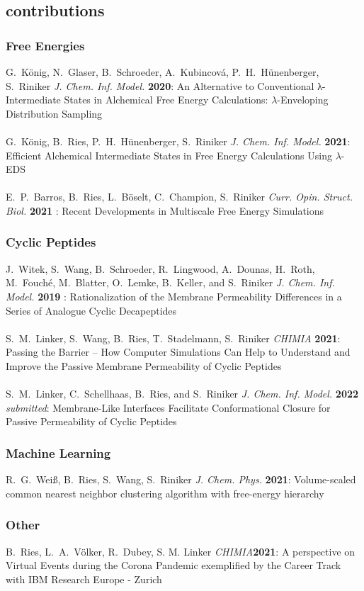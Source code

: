 \subsection*{contributions}

\subsubsection*{Free Energies}

G.\ K\"onig, N.\ Glaser, B.\ Schroeder, A.\ Kubincová, P.\ H.\ H\"unenberger, S.\ Riniker {\em J. Chem. Inf. Model.} {\bf 2020}:
An Alternative to Conventional λ-Intermediate States in Alchemical Free Energy Calculations: $\lambda$-Enveloping Distribution Sampling
\\\\
G.\ K\"onig, B.\ Ries, P.\ H.\ H\"unenberger, S.\ Riniker {\em J. Chem. Inf. Model.} {\bf 2021}:
Efficient Alchemical Intermediate States in Free Energy Calculations Using  $\lambda$-EDS
\\\\
E.\ P.\ Barros, B.\ Ries, L.\ B\"oselt, C.\ Champion, S.\ Riniker {\em Curr. Opin. Struct. Biol.} {\bf 2021} :
Recent Developments in Multiscale Free Energy Simulations


\subsubsection*{Cyclic Peptides}

J.\ Witek, S.\ Wang, B.\ Schroeder, R.\ Lingwood, A.\ Dounas, H.\ Roth, M.\ Fouché, M.\ Blatter, O.\ Lemke, B.\ Keller, and S.\ Riniker {\em J. Chem. Inf. Model.} {\bf 2019} :
Rationalization of the Membrane Permeability Differences in a Series of Analogue Cyclic Decapeptides
\\\\
S.\ M.\ Linker, S.\ Wang, B.\ Ries, T.\ Stadelmann, S.\ Riniker {\em CHIMIA} {\bf 2021}: 
Passing the Barrier – How Computer Simulations Can Help to Understand and Improve the Passive Membrane Permeability of Cyclic Peptides
\\\\
S.\ M.\ Linker, C.\ Schellhaas, B.\ Ries, and S.\ Riniker {\em J. Chem. Inf. Model.} {\bf 2022} {\em submitted}:
Membrane-Like Interfaces Facilitate Conformational Closure for Passive Permeability of Cyclic Peptides

\subsubsection*{Machine Learning}

R.\ G.\ Wei\ss, B.\ Ries, S.\ Wang, S.\ Riniker {\em J. Chem. Phys.} {\bf 2021}:
Volume-scaled common nearest neighbor clustering algorithm with free-energy hierarchy 


\subsubsection*{Other}

B.\ Ries, L.\ A.\ V\"olker, R.\ Dubey, S. M. Linker {\em CHIMIA}{\bf 2021}: A perspective on Virtual Events during the Corona Pandemic exemplified by the Career Track with IBM Research Europe - Zurich